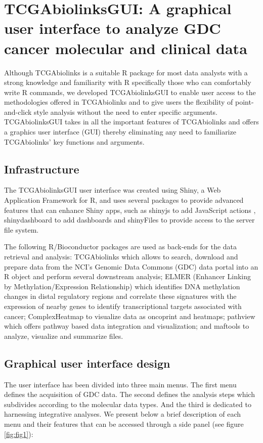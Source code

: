 \newpage
\section{TCGAbiolinksGUI: A graphical user interface to analyze GDC cancer molecular and clinical data}

Although TCGAbiolinks is a suitable R package for most data analysts with a strong knowledge and familiarity with R specifically those who can comfortably write R commands, we developed TCGAbiolinksGUI to enable user access to the methodologies offered in TCGAbiolinks and to give users the flexibility of point-and-click style analysis without the need to enter specific arguments. TCGAbiolinksGUI takes in all the important features of TCGAbiolinks and offers a graphics user interface (GUI) thereby eliminating any need to familiarize TCGAbiolinks' key functions and arguments.

\subsection{Infrastructure}
The TCGAbiolinksGUI user interface was created using Shiny, a Web Application Framework for R, and uses several packages to provide advanced features that can enhance Shiny apps, such as shinyjs to add JavaScript actions \cite{shinyjs}, shinydashboard to add dashboards \cite{shinydashboard} and shinyFiles \cite{shinyFiles} to provide access to the server file system.

The following R/Bioconductor packages are used as back-ends for the data retrieval and analysis: TCGAbiolinks \cite{TCGAbiolinks} which allows to search, download and prepare data from the NCI's Genomic Data Commons (GDC) data portal into an R object and perform several downstream analysis;  ELMER (Enhancer Linking by Methylation/Expression Relationship) \cite{yao2015inferring, ELMER2} which identifies DNA methylation changes in distal regulatory regions and correlate these signatures with the expression of nearby genes to identify transcriptional targets associated with cancer; ComplexHeatmap \cite{Gu20052016} to visualize data as oncoprint and heatmaps; pathview \cite{luo2013pathview} which offers pathway based data integration and visualization; and maftools \cite{Maftools} to analyze, visualize and summarize  files.


\subsection{Graphical user interface design}
The user interface has been divided into three main  menus. The first menu defines the acquisition of GDC data. The second defines the analysis steps which subdivides according to the molecular data types.  And the third is dedicated to harnessing integrative analyses. We present below a brief description of each menu and their features that can be accessed through a side panel (see figure \ref{fig:fig1}):

